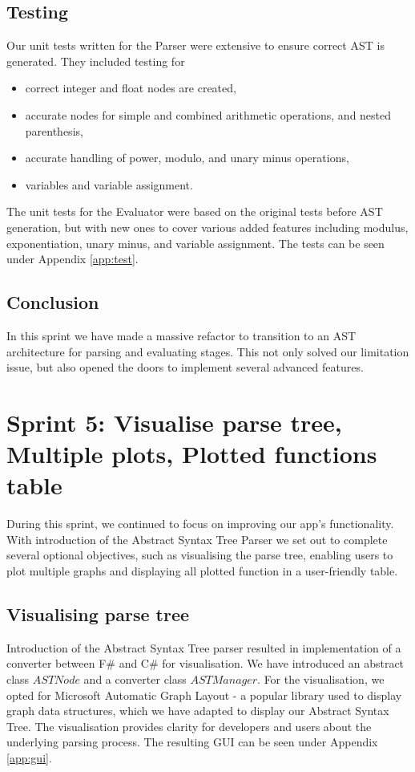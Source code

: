 \documentclass[a4paper, oneside, 11pt]{report}
\begin{document}
\subsection{Testing}
Our unit tests written for the Parser were extensive to ensure correct AST is generated. They included testing for
\begin{itemize}
    \item correct integer and float nodes are created, 
    \item accurate nodes for simple and combined arithmetic operations, and nested parenthesis,
    \item accurate handling of power, modulo, and unary minus operations, 
    \item variables and variable assignment. 
\end{itemize}
The unit tests for the Evaluator were based on the original tests before AST generation, but with new ones to cover various added features including modulus, exponentiation, unary minus, and variable assignment.
The tests can be seen under Appendix \ref{app:test}.

\subsection{Conclusion}
In this sprint we have made a massive refactor to transition to an AST architecture for parsing and evaluating stages. This not only solved our limitation issue, but also opened the doors to implement several advanced features.

\section{Sprint 5: Visualise parse tree, Multiple plots, Plotted functions table}
During this sprint, we continued to focus on improving our app's functionality. With introduction of the Abstract Syntax Tree Parser we set out to complete several optional objectives, such as visualising the parse tree, enabling users to plot multiple graphs and displaying all plotted function in a user-friendly table.

\subsection{Visualising parse tree}
Introduction of the Abstract Syntax Tree parser resulted in implementation of a converter between F\# and C\# for visualisation. We have introduced an abstract class $ASTNode$ and a converter class $ASTManager$. For the visualisation, we opted for Microsoft Automatic Graph Layout\cite{MSAGL} - a popular library used to display graph data structures, which we have adapted to display our Abstract Syntax Tree. The visualisation provides clarity for developers and users about the underlying parsing process. The resulting GUI can be seen under Appendix \ref{app:gui}.
\end{document}
